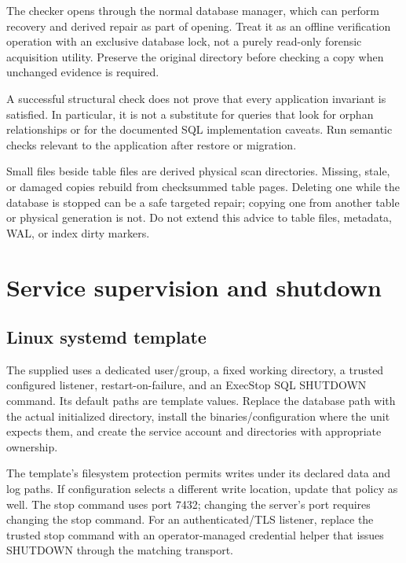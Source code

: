 The checker opens through the normal database manager, which can perform
recovery and derived repair as part of opening. Treat it as an offline
verification operation with an exclusive database lock, not a purely
read-only forensic acquisition utility. Preserve the original directory
before checking a copy when unchanged evidence is required.

A successful structural check does not prove that every application invariant
is satisfied. In particular, it is not a substitute for queries that look for
orphan relationships or for the documented SQL implementation caveats. Run
semantic checks relevant to the application after restore or migration.

Small  files beside table files are derived physical scan
directories. Missing, stale, or damaged copies rebuild from checksummed table
pages. Deleting one while the database is stopped can be a safe targeted
repair; copying one from another table or physical generation is not. Do not
extend this advice to table files, metadata, WAL, or index dirty markers.


\section{Service supervision and shutdown}

\subsection{Linux systemd template}

The supplied  uses a dedicated
 user/group, a fixed working directory, a trusted configured
listener, restart-on-failure, and an ExecStop SQL SHUTDOWN command. Its default
paths are template values. Replace the database path with the actual
initialized directory, install the binaries/configuration where the unit
expects them, and create the service account and directories with appropriate
ownership.

The template's filesystem protection permits writes under its declared data
and log paths. If configuration selects a different write location, update
that policy as well. The stop command uses port 7432; changing the server's
port requires changing the stop command. For an authenticated/TLS listener,
replace the trusted stop command with an operator-managed credential helper
that issues SHUTDOWN through the matching transport.

